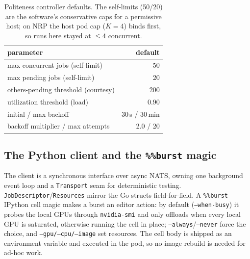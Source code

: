 \documentclass[conference]{IEEEtran}
\begin{document}
\begin{table}[t]\centering\caption{Politeness controller defaults. The self-limits (50/20) are the
software's conservative caps for a permissive host; on NRP the host pod cap ($K{=}4$) binds
first, so runs here stayed at ${\le}4$ concurrent.}\label{tab:cfg}
\begin{tabular}{lr}\toprule
parameter & default \\\midrule
max concurrent jobs (self-limit) & 50 \\
max pending jobs (self-limit) & 20 \\
others-pending threshold (courtesy) & 200 \\
utilization threshold (load) & 0.90 \\
initial / max backoff & 30\,s / 30\,min \\
backoff multiplier / max attempts & 2.0 / 20 \\\bottomrule
\end{tabular}
\end{table}

\subsection{The Python client and the \texttt{\%\%burst} magic}
The client is a synchronous interface over async NATS, owning one background event loop and a
\texttt{Transport} seam for deterministic testing. \texttt{JobDescriptor}/\texttt{Resources}
mirror the Go structs field-for-field. A \texttt{\%\%burst} IPython cell magic makes a burst an
editor action: by default (\texttt{--when-busy}) it probes the local GPUs through
\texttt{nvidia-smi} and only offloads when every local GPU is saturated, otherwise running the
cell in place; \texttt{--always}/\texttt{--never} force the choice, and \texttt{--gpu/--cpu/--image}
set resources. The cell body is shipped as an environment variable and executed in the pod, so
no image rebuild is needed for ad-hoc work.
\end{document}
